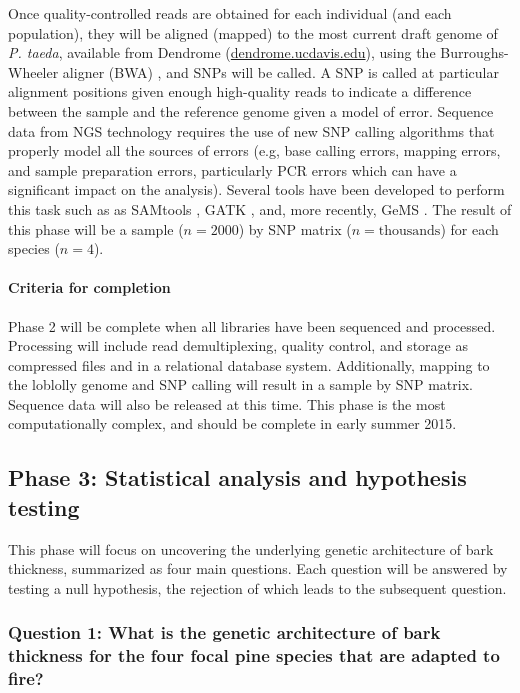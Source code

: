Once quality-controlled reads are obtained for each individual (and each population), they will be aligned (mapped) to the 
most current draft genome of \emph{P. taeda}, available from Dendrome (\url{dendrome.ucdavis.edu}), using the 
Burroughs-Wheeler aligner (BWA) \citep{Li:2009fi}, and SNPs will be called.  A SNP is called at particular alignment positions 
given enough high-quality reads to indicate a difference between the sample and the reference genome given a model of error. 
Sequence data from NGS technology requires the use of new SNP calling algorithms that properly model all the sources of errors 
(e.g, base calling errors, mapping errors, and sample preparation errors, particularly PCR errors which can have a significant 
impact on the analysis). Several tools have been developed to perform this task such as as SAMtools \citep{Li:2009ka}, 
GATK \citep{McKenna:2010bv}, and, more recently, GeMS \citep{You:2012iy}.   
The result of this phase will be a sample ($n = 2000$) by SNP matrix ($n = \text{thousands}$) for each species ($n = 4$).  

\paragraph{Criteria for completion} Phase 2 will be complete when all libraries have been sequenced and processed.  Processing 
will include read demultiplexing, quality control, and storage as compressed files and in a relational database system.  Additionally, 
mapping to the loblolly genome and SNP calling will result in a sample by SNP matrix.  Sequence data will also be released at this time.  
This phase is the most computationally complex, and should be complete in early summer 2015.  

\subsection*{Phase 3: Statistical analysis and hypothesis testing}

This phase will focus on uncovering the underlying genetic architecture of bark thickness, summarized as four main 
questions.  Each question will be answered by testing a null hypothesis, the rejection of which leads to the subsequent question.

\subsubsection*{Question 1: What is the genetic architecture of bark thickness for the four focal pine species that 
are adapted to fire?}

